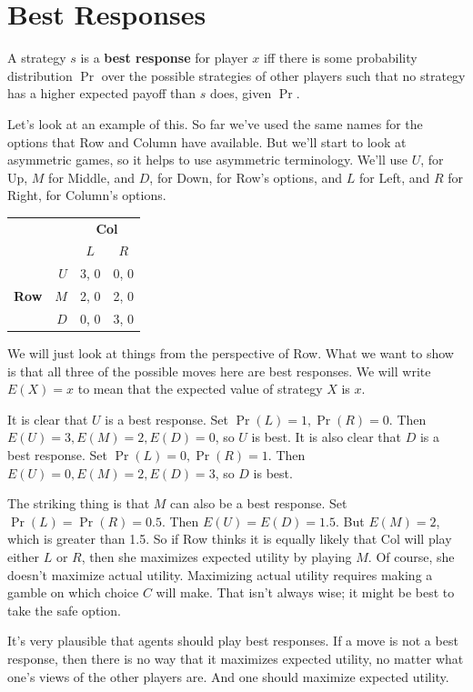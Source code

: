 \documentclass[openany]{book}
\begin{document}
\section{Best Responses}

A strategy $s$ is a \textbf{best response} for player $x$ iff there is some probability distribution $\Pr$ over the possible strategies of other players such that no strategy has a higher expected payoff than $s$ does, given $\Pr$.

Let's look at an example of this. So far we've used the same names for the options that Row and Column have available. But we'll start to look at asymmetric games, so it helps to use asymmetric terminology. We'll use $U$, for Up, $M$ for Middle, and $D$, for Down, for Row's options, and $L$ for Left, and $R$ for Right, for Column's options.

\begin{center}
\begin{tabular}{l r | c c}
& & \multicolumn{2}{c}{\textbf{Col}} \\
& & $L$ & $R$ \\ \hline
\multirow{3}{*}{\textbf{Row}} & $U$ & 3, 0 & 0, 0 \\
& $M$ & 2, 0 & 2, 0 \\
& $D$ & 0, 0 & 3, 0
\end{tabular}
\end{center}
We will just look at things from the perspective of Row. What we want to show is that all three of the possible moves here are best responses. We will write $E(X) = x$ to mean that the expected value of strategy $X$ is $x$.

It is clear that $U$ is a best response. Set $\Pr(L) = 1, \Pr(R) = 0$. Then $E(U) = 3, E(M) = 2, E(D) = 0$, so $U$ is best. It is also clear that $D$ is a best response. Set $\Pr(L) = 0, \Pr(R) = 1$. Then $E(U) = 0, E(M) = 2, E(D) = 3$, so $D$ is best.

The striking thing is that $M$ can also be a best response. Set $\Pr(L) = \Pr(R) = 0.5$. Then $E(U) = E(D) = 1.5$. But $E(M) = 2$, which is greater than 1.5. So if Row thinks it is equally likely that Col will play either $L$ or $R$, then she maximizes expected utility by playing $M$. Of course, she doesn't maximize actual utility. Maximizing actual utility requires making a gamble on which choice $C$ will make. That isn't always wise; it might be best to take the safe option.

It's very plausible that agents should play best responses. If a move is not a best response, then there is no way that it maximizes expected utility, no matter what one's views of the other players are. And one should maximize expected utility. 
\end{document}
